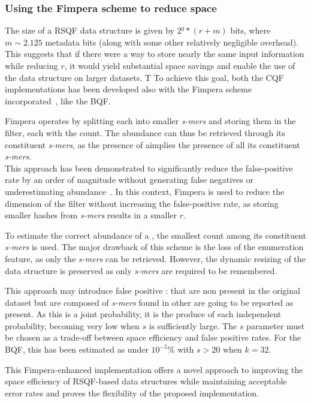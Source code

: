\subsubsection{Using the Fimpera scheme to reduce space}
The size of a RSQF data structure is given by $2^q * (r + m )$ bits, where $m\sim 2.125$ metadata bits (along with some other relatively negligible overhead). This suggests that if there were a way to store nearly the same input information while reducing $r$, it would yield substantial space savings and enable the use of the data structure on larger datasets. T To achieve this goal, both the CQF implementations has been developed also with the Fimpera scheme incorporated~\cite{fimpera}, like the BQF.

Fimpera operates by splitting each \kmer into smaller \emph{s-mers} and storing them in the filter, each with the \kmer count. The \kmer abundance can thus be retrieved through its constituent \emph{s-mers}, as the presence of a\kmer implies the presence of all its constituent \emph{s-mers}.\\
This approach has been demonstrated to significantly reduce the false-positive rate by an order of magnitude without generating false negatives or underestimating \kmer abundance~\cite{fimpera}. In this context, Fimpera is used to reduce the dimension of the filter without increasing the false-positive rate, as storing smaller hashes from \emph{s-mers} results in a smaller $r$.

To estimate the correct abundance of a \kmer, the smallest count among its constituent \emph{s-mers} is used.
The major drawback of this scheme is the loss of the \kmer enumeration feature, as only the \emph{s-mers} can be retrieved. However, the dynamic resizing of the data structure is preserved as only \emph{s-mers} are required to be remembered.

This approach may introduce false positive \kmers: \kmers that are non present in the original dataset but are composed of \emph{s-mers} found in other \kmers are going to be reported as present. As this is a joint probability, it is the produce of each independent probability, becoming very low when $s$ is sufficiently large. The $s$ parameter must be chosen as a trade-off between space efficiency and false positive rates. For the BQF, this has been estimated as under $10^{-5}\%$ with $s > 20$ when $k = 32$.

This Fimpera-enhanced implementation offers a novel approach to improving the space efficiency of RSQF-based data structures while maintaining acceptable error rates and proves the flexibility of the proposed implementation.


